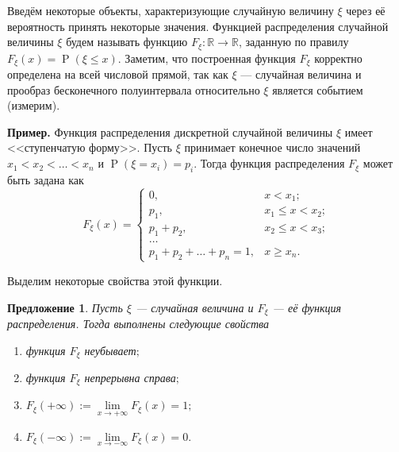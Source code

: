 \documentclass[12pt]{article}
\newtheorem{proposition}[theorem]{Предложение}
\numberwithin{theorem}{section}
\theoremstyle{definition}
\newenvironment{example}{\indent \textbf{Пример.}}{\indent}
\newcommand{\RR}{\mathbb{R}}
\newcommand{\prob}{\operatorname{P}}
\newcommand{\defin}[2]{\hypertarget{#2}{{\color{red} #1}}}
\begin{document}
	Введём некоторые объекты, характеризующие случайную величину $ \xi $ через её вероятность принять некоторые значения.
	\defin{Функцией распределения случайной величины $ \xi $}{distribution-function} 
	будем называть функцию $ F_\xi \colon \RR \to \RR $, заданную по правилу 
	$ F_\xi(x) = \prob(\xi \leqslant x) $.
	Заметим, что построенная функция $ F_\xi $ корректно определена на всей числовой прямой,
	так как $ \xi $ --- случайная величина и прообраз бесконечного полуинтервала относительно $ \xi $
	является событием (измерим).
	
	\begin{example}
		Функция распределения дискретной случайной величины $ \xi $ имеет <<ступенчатую форму>>.
		Пусть $ \xi $ принимает конечное число значений $ x_1 < x_2 < \ldots < x_n $
		и $ \prob(\xi = x_i) = p_i $.
		Тогда функция распределения $ F_\xi $ может быть задана как 
		$$ F_\xi(x) = 
		\begin{cases}
			0, & x < x_1; \\
			p_1, & x_1 \leqslant x < x_2; \\
			p_1 + p_2, & x_2 \leqslant x < x_3; \\
			\ldots \\
			p_1 + p_2 + \ldots + p_n = 1, & x \geqslant x_n.
		\end{cases} $$
	\end{example}
	
	Выделим некоторые свойства этой функции.
	
	\begin{proposition} \label{distribution function properties}
		Пусть $ \xi $ --- случайная величина и $ F_\xi $ --- её функция распределения.
		Тогда выполнены следующие свойства
		\begin{enumerate}
			\item функция $ F_\xi $ неубывает$ ; $ \label{distribution function properties | monotonic}
			\item функция $ F_\xi $ непрерывна справа$ ; $ \label{distribution function properties | right continuous}
			\item $ F_\xi(+\infty) := \lim\limits_{x \to +\infty} F_\xi(x) = 1; $ 
			\label{distribution function properties | 1 at +inf}
			\item $ F_\xi(-\infty) := \lim\limits_{x \to -\infty} F_\xi(x) = 0. $
			\label{distribution function properties | 0 at -inf}
 		\end{enumerate}
	\end{proposition}
	
\end{document}
